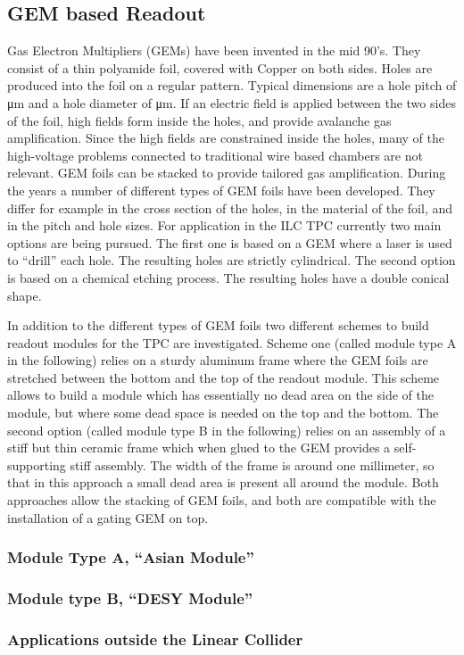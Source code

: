 \subsection{GEM based Readout}\label{chap:TPC_sec:standard_gems}

Gas Electron Multipliers (GEMs) \cite{Sauli1997531} have been invented in the mid 90's. They consist of a thin polyamide foil, covered with Copper on both sides. Holes are produced into the foil on a regular pattern. Typical dimensions are a hole pitch of \unit[140]{\micro m} and a hole diameter of \unit[70]{\micro m}. If an electric field is applied between the two sides of the foil, high fields form inside the holes, and provide avalanche gas amplification. Since the high fields are constrained inside the holes, many of the high-voltage problems connected to traditional wire based chambers are not relevant. GEM foils can be stacked to provide tailored gas amplification. During the years a number of different types of GEM foils have been developed. They differ for example in the cross section of the holes, in the material of the foil, and in the pitch and hole sizes. For application in the ILC TPC currently two main options are being pursued. The first one is based on a GEM where a laser is used to ``drill'' each hole.
The resulting holes are
strictly cylindrical. The second option is based on a chemical etching process. The resulting holes have a double conical shape.

In addition to the different types of GEM foils two different schemes to build readout modules for the TPC are investigated. Scheme one (called module type A in the following) relies on a sturdy aluminum frame where the GEM foils are stretched between the bottom and the top of the readout module. This scheme allows to build a module which has essentially no dead area on the side of the module, but where some dead space is needed on the top and the bottom. The second option (called module type B in the following) relies on an assembly of a stiff but thin ceramic frame which when glued to the GEM provides a self-supporting stiff assembly. The width of the frame is around one millimeter, so that in this approach a small dead area is present all around the module. Both approaches allow the stacking of GEM foils, and both are compatible with the installation of a gating GEM on top.

\subsubsection{Module Type A, ``Asian Module''}

\subsubsection{Module type B, ``DESY Module''}

\subsubsection{Applications outside the Linear Collider}
